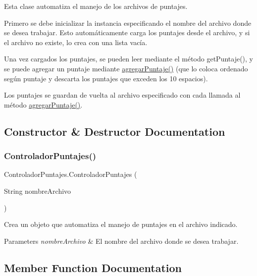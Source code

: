 Esta clase automatiza el manejo de los archivos de puntajes.

Primero se debe inicializar la instancia especificando el nombre del archivo donde se desea trabajar. Esto automáticamente carga los puntajes desde el archivo, y si el archivo no existe, lo crea con una lista vacía.

Una vez cargados los puntajes, se pueden leer mediante el método get\+Puntaje(), y se puede agregar un puntaje mediante \mbox{\hyperlink{class_controlador_puntajes_a101a964a47c4ed0036f70c3a5c2d58ca}{agregar\+Puntaje()}} (que lo coloca ordenado según puntaje y descarta los puntajes que exceden los 10 espacios).

Los puntajes se guardan de vuelta al archivo especificado con cada llamada al método \mbox{\hyperlink{class_controlador_puntajes_a101a964a47c4ed0036f70c3a5c2d58ca}{agregar\+Puntaje()}}. 

\subsection{Constructor \& Destructor Documentation}
\mbox{\label{class_controlador_puntajes_ab192cfbffc96954094f47b5b66e8cda5}} 
\subsubsection{\texorpdfstring{Controlador\+Puntajes()}{ControladorPuntajes()}}
{\footnotesize\ttfamily Controlador\+Puntajes.\+Controlador\+Puntajes (\begin{DoxyParamCaption}\item[{String}]{nombre\+Archivo }\end{DoxyParamCaption})}



Crea un objeto que automatiza el manejo de puntajes en el archivo indicado. 


\begin{DoxyParams}{Parameters}
{\em nombre\+Archivo} & El nombre del archivo donde se desea trabajar. \\
\hline
\end{DoxyParams}


\subsection{Member Function Documentation}
\mbox{\label{class_controlador_puntajes_a101a964a47c4ed0036f70c3a5c2d58ca}} 
